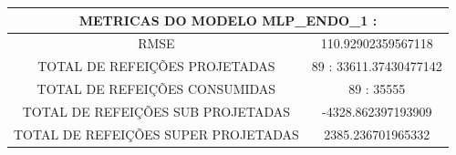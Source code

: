 \documentclass[	12pt, Times, openright, twoside, a4paper, english, brazil]{abntex2}
\begin{document}
                \begin{figure}[H]
                \end{figure}

                \begin{figure}[H]
                \end{figure}
                
                
                \begin{tabular}{|c|c|}
                \hline
                \multicolumn{2}{c}{METRICAS DO MODELO MLP\_ENDO\_1 :}\\ \hline
                RMSE &  110.92902359567118\\
                TOTAL DE REFEIÇÕES PROJETADAS & 89 : 33611.37430477142\\
                TOTAL DE REFEIÇÕES CONSUMIDAS & 89 : 35555\\
                TOTAL DE REFEIÇÕES SUB PROJETADAS & -4328.862397193909\\
                TOTAL DE REFEIÇÕES SUPER PROJETADAS & 2385.236701965332\\
                \hline
                 \end{tabular}
                 
\end{document}
